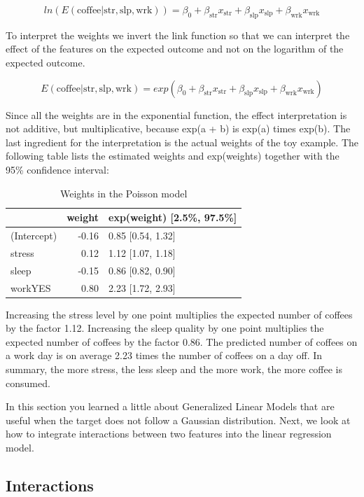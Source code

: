 \documentclass[
  10pt,
]{scrbook}
\begin{document}
\[ln(E(\text{coffee}|\text{str},\text{slp},\text{wrk}))=\beta_0+\beta_{\text{str}}x_{\text{str}}+\beta_{\text{slp}}x_{\text{slp}}+\beta_{\text{wrk}}x_{\text{wrk}}\]

To interpret the weights we invert the link function so that we can interpret the effect of the features on the expected outcome and not on the logarithm of the expected outcome.

\[E(\text{coffee}|\text{str},\text{slp},\text{wrk})=exp(\beta_0+\beta_{\text{str}}x_{\text{str}}+\beta_{\text{slp}}x_{\text{slp}}+\beta_{\text{wrk}}x_{\text{wrk}})\]

Since all the weights are in the exponential function, the effect interpretation is not additive, but multiplicative, because exp(a + b) is exp(a) times exp(b).
The last ingredient for the interpretation is the actual weights of the toy example.
The following table lists the estimated weights and exp(weights) together with the 95\% confidence interval:

\begin{table}

\caption{\label{tab:poisson-model-params}Weights in the Poisson model}
\centering
\begin{tabular}[t]{lrl}
\toprule
  & weight & exp(weight) [2.5\%, 97.5\%]\\
\midrule
(Intercept) & -0.16 & 0.85 [0.54, 1.32]\\
stress & 0.12 & 1.12 [1.07, 1.18]\\
sleep & -0.15 & 0.86 [0.82, 0.90]\\
workYES & 0.80 & 2.23 [1.72, 2.93]\\
\bottomrule
\end{tabular}
\end{table}

Increasing the stress level by one point multiplies the expected number of coffees by the factor 1.12.
Increasing the sleep quality by one point multiplies the expected number of coffees by the factor 0.86.
The predicted number of coffees on a work day is on average 2.23 times the number of coffees on a day off.
In summary, the more stress, the less sleep and the more work, the more coffee is consumed.

In this section you learned a little about Generalized Linear Models that are useful when the target does not follow a Gaussian distribution.
Next, we look at how to integrate interactions between two features into the linear regression model.

\hypertarget{lm-interact}{%
\subsection{Interactions}\label{lm-interact}}
\end{document}
